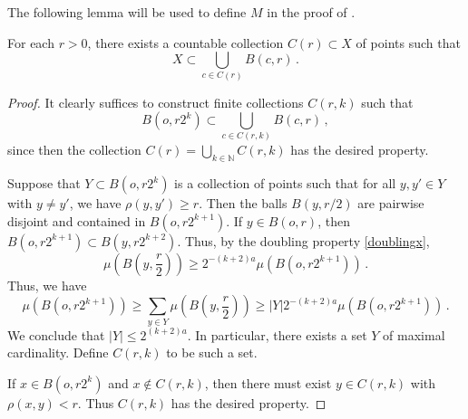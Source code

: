 The following lemma will be used to define $M$ in the proof of .
\begin{lemma}
    \label{covering-separable-space}
    \leanok
    For each $r > 0$, there exists a countable collection $C(r) \subset X$ of points such that
    $$
        X \subset \bigcup_{c \in C(r)} B(c, r)\,.
    $$
\end{lemma}

\begin{proof}
    \leanok
    It clearly suffices to construct finite collections $C(r,k)$ such that
    $$
        B(o, r2^k) \subset \bigcup_{c \in C(r,k)} B(c,r)\,,
    $$
    since then the collection $C(r) = \bigcup_{k \in \mathbb{N}} C(r,k)$ has the desired property.

    Suppose that $Y \subset B(o, r2^k)$ is a collection of points such that for all $y, y' \in Y$ with $y \ne y'$, we have $\rho(y,y') \ge r$. Then the balls $B(y, r/2)$ are pairwise disjoint and contained in $B(o, r2^{k+1})$. If $y \in B(o, r)$, then $B(o, r2^{k+1}) \subset B(y, r2^{k+2})$. Thus, by the doubling property \eqref{doublingx},
    $$
        \mu(B(y, \frac{r}{2})) \ge 2^{-(k+2)a} \mu(B(o, r2^{k+1}))\,.
    $$
    Thus, we have
    $$
        \mu(B(o, r2^{k+1})) \ge \sum_{y \in Y} \mu(B(y, \frac{r}{2})) \ge |Y| 2^{-(k+2)a} \mu(B(o, r2^{k+1}))\,.
    $$
    We conclude that $|Y| \le 2^{(k+2)a}$. In particular, there exists a set $Y$ of maximal cardinality. Define $C(r,k)$ to be such a set.

    If $x \in B(o, r2^k)$ and $x \notin C(r,k)$, then there must exist $y \in C(r,k)$ with $\rho(x,y) < r$. Thus $C(r,k)$ has the desired property.
\end{proof}

